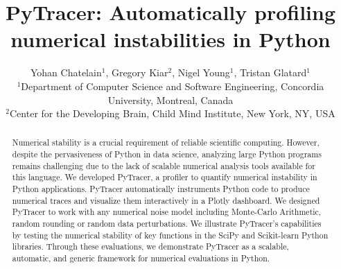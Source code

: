 \documentclass[11pt]{article}
\newcommand{\tristan}[1]{\color{orange}\textbf{From Tristan:} #1\color{black}\xspace}
\newcommand{\pytracer}[0]{PyTracer\xspace}
\begin{document}
\makeatletter
\let\orig@lstnumber=\thelstnumber
\newcommand\lstsetnumber[1]{\gdef\thelstnumber{#1}}
\newcommand\lstresetnumber{\global\let\thelstnumber=\orig@lstnumber}
\makeatother

\title{PyTracer: Automatically profiling numerical instabilities in Python}
\author{Yohan Chatelain$^1$, Gregory Kiar$^2$, Nigel Young$^1$, Tristan Glatard$^1$\\
$^1$Department of Computer Science and Software Engineering, Concordia University, Montreal, Canada\\
$^2$Center for the Developing Brain, Child Mind Institute, New York, NY, USA}
\date{}
\maketitle

\begin{abstract}
Numerical stability is a crucial requirement of reliable scientific computing. However, despite the pervasiveness of Python in data science, analyzing large Python programs remains challenging due to the lack of scalable numerical analysis tools available for this language. We developed \pytracer, a profiler to quantify numerical instability in Python applications. \pytracer automatically instruments Python code to produce numerical traces and visualize them interactively in a Plotly dashboard. We designed \pytracer to work with any numerical noise model including Monte-Carlo Arithmetic, random rounding or random data perturbations. We illustrate \pytracer's capabilities by testing the numerical stability of key functions in the SciPy and Scikit-learn Python libraries. Through these evaluations, we demonstrate \pytracer as a scalable, automatic, and generic framework for numerical evaluations in Python.
\end{abstract}
\end{document}
